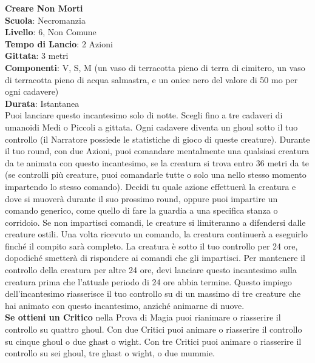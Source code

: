 \begin{multicols}{2}
\medskip\textbf{Creare Non Morti}\\
\textbf{Scuola}: Necromanzia\\
\textbf{Livello}: 6, Non Comune\\
\textbf{Tempo di Lancio}: 2 Azioni\\
\textbf{Gittata}: 3 metri\\
\textbf{Componenti}: V, S, M (un vaso di terracotta pieno di terra di cimitero, un vaso di terracotta pieno di acqua salmastra, e un onice nero del valore di 50 mo per ogni cadavere)\\
\textbf{Durata}: Istantanea\\
Puoi lanciare questo incantesimo solo di notte. Scegli fino a tre cadaveri di umanoidi Medi o Piccoli a gittata. Ogni cadavere diventa un ghoul sotto il tuo controllo (il Narratore possiede le statistiche di gioco di queste creature). Durante il tuo round, con due Azioni, puoi comandare mentalmente una qualsiasi creatura da te animata con questo incantesimo, se la creatura si trova entro 36 metri da te (se controlli più creature, puoi comandarle tutte o solo una nello stesso momento impartendo lo stesso comando). Decidi tu quale azione effettuerà la creatura e dove si muoverà durante il suo prossimo round, oppure puoi impartire un comando generico, come quello di fare la guardia a una specifica stanza o corridoio. Se non impartisci comandi, le creature si limiteranno a difendersi dalle creature ostili. Una volta ricevuto un comando, la creatura continuerà a eseguirlo finché il compito sarà completo. La creatura è sotto il tuo controllo per 24 ore, dopodiché smetterà di rispondere ai comandi che gli impartisci. Per mantenere il controllo della creatura per altre 24 ore, devi lanciare questo incantesimo sulla creatura prima che l'attuale periodo di 24 ore abbia termine. Questo impiego dell'incantesimo riasserisce il tuo controllo su di un massimo di tre creature che hai animato con questo incantesimo, anziché animarne di nuove.\\
\textbf{Se ottieni un Critico} nella Prova di Magia puoi rianimare o riasserire il controllo su quattro ghoul. Con due Critici puoi animare o riasserire il controllo su cinque
ghoul o due ghast o wight. Con tre Critici puoi animare o riasserire il controllo su sei ghoul, tre ghast o wight, o due mummie.


\end{multicols}
